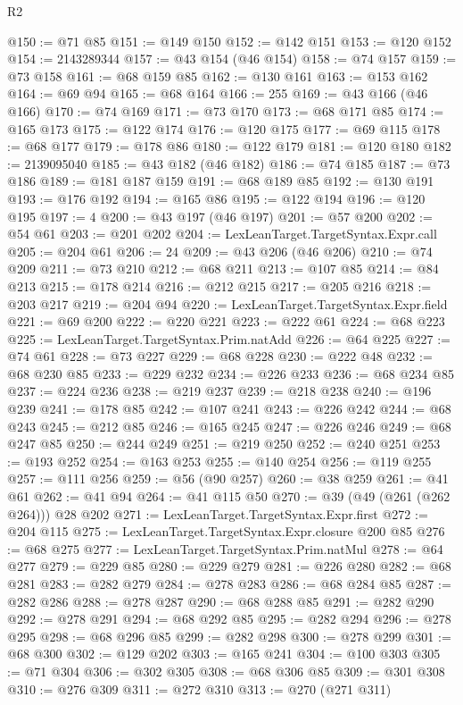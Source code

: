 \begin{lexlean}{R2}
\begin{coremodule}
@150 := @71 @85
@151 := @149 @150
@152 := @142 @151
@153 := @120 @152
@154 := 2143289344
@157 := @43 @154 (@46 @154)
@158 := @74 @157
@159 := @73 @158
@161 := @68 @159 @85
@162 := @130 @161
@163 := @153 @162
@164 := @69 @94
@165 := @68 @164
@166 := 255
@169 := @43 @166 (@46 @166)
@170 := @74 @169
@171 := @73 @170
@173 := @68 @171 @85
@174 := @165 @173
@175 := @122 @174
@176 := @120 @175
@177 := @69 @115
@178 := @68 @177
@179 := @178 @86
@180 := @122 @179
@181 := @120 @180
@182 := 2139095040
@185 := @43 @182 (@46 @182)
@186 := @74 @185
@187 := @73 @186
@189 := @181 @187 @159
@191 := @68 @189 @85
@192 := @130 @191
@193 := @176 @192
@194 := @165 @86
@195 := @122 @194
@196 := @120 @195
@197 := 4
@200 := @43 @197 (@46 @197)
@201 := @57 @200
@202 := @54 @61
@203 := @201 @202
@204 := LexLeanTarget.TargetSyntax.Expr.call
@205 := @204 @61
@206 := 24
@209 := @43 @206 (@46 @206)
@210 := @74 @209
@211 := @73 @210
@212 := @68 @211
@213 := @107 @85
@214 := @84 @213
@215 := @178 @214
@216 := @212 @215
@217 := @205 @216
@218 := @203 @217
@219 := @204 @94
@220 := LexLeanTarget.TargetSyntax.Expr.field
@221 := @69 @200
@222 := @220 @221
@223 := @222 @61
@224 := @68 @223
@225 := LexLeanTarget.TargetSyntax.Prim.natAdd
@226 := @64 @225
@227 := @74 @61
@228 := @73 @227
@229 := @68 @228
@230 := @222 @48
@232 := @68 @230 @85
@233 := @229 @232
@234 := @226 @233
@236 := @68 @234 @85
@237 := @224 @236
@238 := @219 @237
@239 := @218 @238
@240 := @196 @239
@241 := @178 @85
@242 := @107 @241
@243 := @226 @242
@244 := @68 @243
@245 := @212 @85
@246 := @165 @245
@247 := @226 @246
@249 := @68 @247 @85
@250 := @244 @249
@251 := @219 @250
@252 := @240 @251
@253 := @193 @252
@254 := @163 @253
@255 := @140 @254
@256 := @119 @255
@257 := @111 @256
@259 := @56 (@90 @257)
@260 := @38 @259
@261 := @41 @61
@262 := @41 @94
@264 := @41 @115 @50
@270 := @39 (@49 (@261 (@262 @264))) @28 @202
@271 := LexLeanTarget.TargetSyntax.Expr.first
@272 := @204 @115
@275 := LexLeanTarget.TargetSyntax.Expr.closure @200 @85
@276 := @68 @275
@277 := LexLeanTarget.TargetSyntax.Prim.natMul
@278 := @64 @277
@279 := @229 @85
@280 := @229 @279
@281 := @226 @280
@282 := @68 @281
@283 := @282 @279
@284 := @278 @283
@286 := @68 @284 @85
@287 := @282 @286
@288 := @278 @287
@290 := @68 @288 @85
@291 := @282 @290
@292 := @278 @291
@294 := @68 @292 @85
@295 := @282 @294
@296 := @278 @295
@298 := @68 @296 @85
@299 := @282 @298
@300 := @278 @299
@301 := @68 @300
@302 := @129 @202
@303 := @165 @241
@304 := @100 @303
@305 := @71 @304
@306 := @302 @305
@308 := @68 @306 @85
@309 := @301 @308
@310 := @276 @309
@311 := @272 @310
@313 := @270 (@271 @311)

\end{coremodule}
\end{lexlean}
